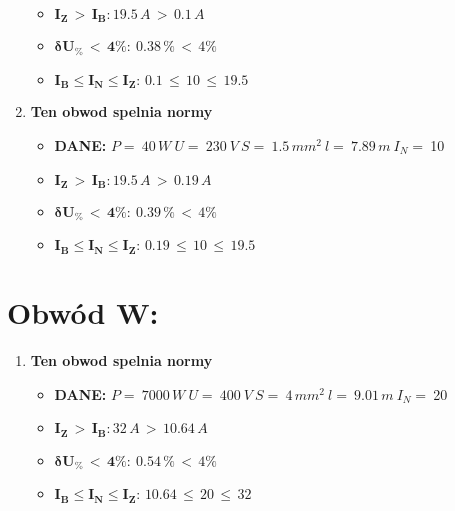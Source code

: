 \begin{enumerate}
\begin{itemize}
\item[\textcolor{Green}{\cmark}] $ \pmb{I_Z \, >  \, I_B: }19.5 \, A \, > \,0.1 \, A $
\item[\textcolor{Green}{\cmark}] $ \pmb{ \delta U_\% \, < \, 4\%:} \:0.38 \, \% \,< \, 4\% $
\item[\textcolor{Green}{\cmark}] $ \pmb{I_B \le I_N \le I_Z: } \, 0.1 \, \le \,10 \, \le \,19.5 $
\end{itemize}
\item \textcolor{Green}{\cmark} \textbf{Ten obwod spelnia normy} 
\begin{itemize}
\item[] \textbf{DANE: } \: $ P = \:40\, W\: U = \:230\: V\: S = \:1.5\, mm^2\: l = \:7.89\, m\: I_N= \: $10
\item[\textcolor{Green}{\cmark}] $ \pmb{I_Z \, >  \, I_B: }19.5 \, A \, > \,0.19 \, A $
\item[\textcolor{Green}{\cmark}] $ \pmb{ \delta U_\% \, < \, 4\%:} \:0.39 \, \% \,< \, 4\% $
\item[\textcolor{Green}{\cmark}] $ \pmb{I_B \le I_N \le I_Z: } \, 0.19 \, \le \,10 \, \le \,19.5 $
\end{itemize}
\end{enumerate}
\section{Obwód W:}

\begin{enumerate}
\item \textcolor{Green}{\cmark} \textbf{Ten obwod spelnia normy} 
\begin{itemize}
\item[] \textbf{DANE: } \: $ P = \:7000\, W\: U = \:400\: V\: S = \:4\, mm^2\: l = \:9.01\, m\: I_N= \: $20
\item[\textcolor{Green}{\cmark}] $ \pmb{I_Z \, >  \, I_B: }32 \, A \, > \,10.64 \, A $
\item[\textcolor{Green}{\cmark}] $ \pmb{ \delta U_\% \, < \, 4\%:} \:0.54 \, \% \,< \, 4\% $
\item[\textcolor{Green}{\cmark}] $ \pmb{I_B \le I_N \le I_Z: } \, 10.64 \, \le \,20 \, \le \,32 $
\end{itemize}
\end{enumerate}